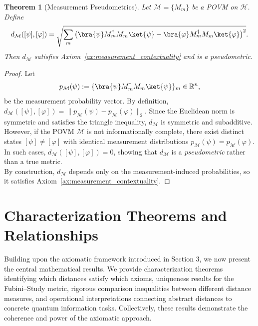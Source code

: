 \documentclass[aps,pra,reprint,nofootinbib,showpacs,superscriptaddress]{revtex4-1}
\newtheorem{theorem}{Theorem}[section]
\newcommand{\Hilbert}{\mathcal{H}}
\begin{document}
\begin{theorem}[Measurement Pseudometrics]
Let $\mathcal{M} = \{M_m\}$ be a POVM on $\Hilbert$. Define
\[
d_\mathcal{M}([\psi],[\varphi])
=
\sqrt{\sum_m 
\big(
\bra{\psi} M_m^\dagger M_m \ket{\psi}
-
\bra{\varphi} M_m^\dagger M_m \ket{\varphi}
\big)^2 }.
\]
Then $d_\mathcal{M}$ satisfies Axiom~\ref{ax:measurement_contextuality} and is a pseudometric.
\end{theorem}

\begin{proof}
Let
\[
p_\mathcal{M}(\psi) := \{\bra{\psi} M_m^\dagger M_m \ket{\psi}\}_m \in \mathbb{R}^n,
\]
be the measurement probability vector.  
By definition,
\(
d_\mathcal{M}([\psi],[\varphi]) = \| p_\mathcal{M}(\psi) - p_\mathcal{M}(\varphi) \|_2.
\)
Since the Euclidean norm is symmetric and satisfies the triangle inequality, $d_\mathcal{M}$ is symmetric and subadditive.\\
However, if the POVM $\mathcal{M}$ is not informationally complete, there exist distinct states $[\psi] \neq [\varphi]$ with identical measurement distributions $p_\mathcal{M}(\psi) = p_\mathcal{M}(\varphi)$. In such cases, $d_\mathcal{M}([\psi],[\varphi]) = 0$, showing that $d_\mathcal{M}$ is a \emph{pseudometric} rather than a true metric.  \\
By construction, $d_\mathcal{M}$ depends only on the measurement-induced probabilities, so it satisfies Axiom~\ref{ax:measurement_contextuality}.
\end{proof}







%
\section{Characterization Theorems and Relationships}\label{sec:thm}

Building upon the axiomatic framework introduced in Section 3, we now present the central mathematical results. We provide characterization theorems identifying which distances satisfy which axioms, uniqueness results for the Fubini–Study metric, rigorous comparison inequalities between different distance measures, and operational interpretations connecting abstract distances to concrete quantum information tasks. Collectively, these results demonstrate the coherence and power of the axiomatic approach.
\end{document}
